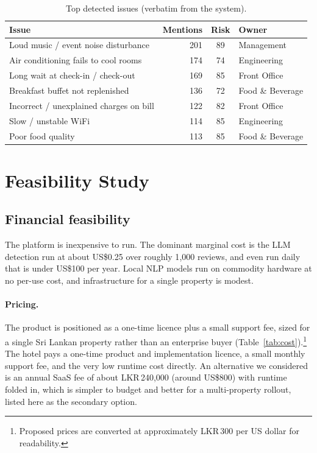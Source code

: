 \documentclass[11pt,a4paper]{article}
\begin{document}
\begin{table}[H]
\centering
\caption{Top detected issues (verbatim from the system).}
\label{tab:issues}
\begin{tabularx}{\linewidth}{Xrcl}
\toprule
\textbf{Issue} & \textbf{Mentions} & \textbf{Risk} & \textbf{Owner} \\
\midrule
Loud music / event noise disturbance & 201 & 89 & Management \\
Air conditioning fails to cool rooms  & 174 & 74 & Engineering \\
Long wait at check-in / check-out     & 169 & 85 & Front Office \\
Breakfast buffet not replenished      & 136 & 72 & Food \& Beverage \\
Incorrect / unexplained charges on bill & 122 & 82 & Front Office \\
Slow / unstable WiFi                  & 114 & 85 & Engineering \\
Poor food quality                     & 113 & 85 & Food \& Beverage \\
\bottomrule
\end{tabularx}
\end{table}

\section{Feasibility Study}
\label{sec:feasibility}

\subsection{Financial feasibility}
\label{sec:financial}
The platform is inexpensive to run. The dominant marginal cost is the LLM detection run at about
US\$0.25 over roughly 1{,}000 reviews, and even run daily that is under US\$100 per year. Local NLP
models run on commodity hardware at no per-use cost, and infrastructure for a single property is modest.

\paragraph{Pricing.} The product is positioned as a one-time licence plus a small support fee, sized for
a single Sri Lankan property rather than an enterprise buyer (Table~\ref{tab:cost}).\footnote{Proposed
prices are converted at approximately LKR\,300 per US dollar for readability.} The hotel pays a one-time product and implementation licence, a small monthly
support fee, and the very low runtime cost directly. An alternative we considered is an annual SaaS fee
of about LKR\,240{,}000 (around US\$800) with runtime folded in, which is simpler to budget and better
for a multi-property rollout, listed here as the secondary option.
\end{document}
